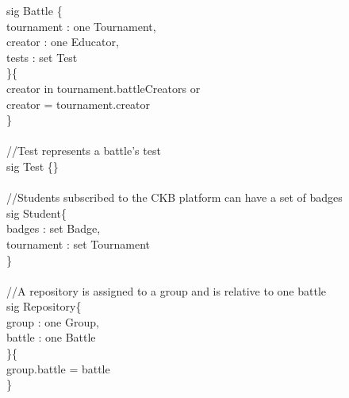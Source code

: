 \documentclass{article}
\begin{document}
{\color{blue}
sig
\color{black}
Battle \{\\
\-\hspace{1cm}    tournament : \color{blue} one \color{black} Tournament,\\
\-\hspace{1cm}    creator : \color{blue} one \color{black} Educator,\\
\-\hspace{1cm}	tests : \color{blue} set \color{black} Test\\
\}\{\\
\-\hspace{1cm}	creator \color{blue} in \color{black} tournament.battleCreators \color{blue} or \color{black}\\
\-\hspace{1cm}	creator \color{blue} = \color{black} tournament.creator\\
\}\\
\color{gray}
\\
//Test represents a battle's test\\
\color{blue}
sig
\color{black}
Test \{\}\\
\color{gray}
\\
//Students subscribed to the CKB platform can have a set of badges\\
\color{blue}
sig
\color{black}
Student\{\\
\-\hspace{1cm}    badges : \color{blue} set \color{black} Badge,\\
\-\hspace{1cm}    tournament : \color{blue} set \color{black} Tournament\\
\}\\
\color{gray}
\\
//A repository is assigned to a group and is relative to one battle\\
\color{blue}
sig
\color{black}
Repository\{\\
\-\hspace{1cm}    group : \color{blue} one \color{black} Group,\\
\-\hspace{1cm}    battle : \color{blue} one \color{black} Battle\\
\}\{\\
\-\hspace{1cm}    group.battle \color{blue} = \color{black} battle\\
\}\\
\\
}
\end{document}
